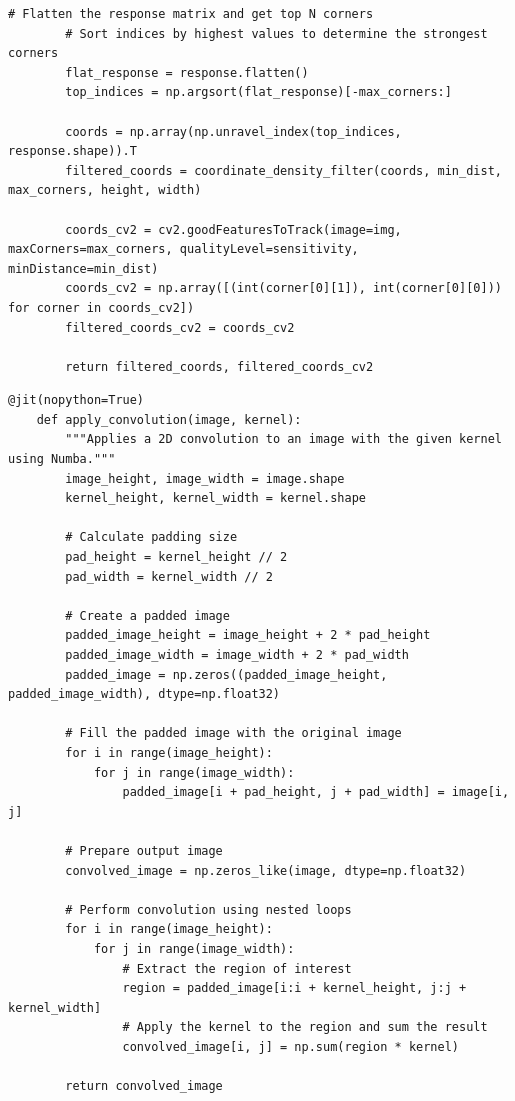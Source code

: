 \documentclass[11pt, conference, letterpaper]{IEEEtran}
\begin{document}
\begin{lstlisting}[style=python, caption={Shi-Tomasi Corners Function}, label={lst:shi-tomasi}]
        # Flatten the response matrix and get top N corners
        # Sort indices by highest values to determine the strongest corners
        flat_response = response.flatten()
        top_indices = np.argsort(flat_response)[-max_corners:]

        coords = np.array(np.unravel_index(top_indices, response.shape)).T
        filtered_coords = coordinate_density_filter(coords, min_dist, max_corners, height, width)

        coords_cv2 = cv2.goodFeaturesToTrack(image=img, maxCorners=max_corners, qualityLevel=sensitivity, minDistance=min_dist)
        coords_cv2 = np.array([(int(corner[0][1]), int(corner[0][0])) for corner in coords_cv2])
        filtered_coords_cv2 = coords_cv2
        
        return filtered_coords, filtered_coords_cv2
\end{lstlisting}

\begin{lstlisting}[style=python, caption={2-Dimensional Convolution Routine}, label={lst:convolution}]
    @jit(nopython=True)
    def apply_convolution(image, kernel):
        """Applies a 2D convolution to an image with the given kernel using Numba."""
        image_height, image_width = image.shape
        kernel_height, kernel_width = kernel.shape
        
        # Calculate padding size
        pad_height = kernel_height // 2
        pad_width = kernel_width // 2
        
        # Create a padded image
        padded_image_height = image_height + 2 * pad_height
        padded_image_width = image_width + 2 * pad_width
        padded_image = np.zeros((padded_image_height, padded_image_width), dtype=np.float32)

        # Fill the padded image with the original image
        for i in range(image_height):
            for j in range(image_width):
                padded_image[i + pad_height, j + pad_width] = image[i, j]

        # Prepare output image
        convolved_image = np.zeros_like(image, dtype=np.float32)

        # Perform convolution using nested loops
        for i in range(image_height):
            for j in range(image_width):
                # Extract the region of interest
                region = padded_image[i:i + kernel_height, j:j + kernel_width]
                # Apply the kernel to the region and sum the result
                convolved_image[i, j] = np.sum(region * kernel)
        
        return convolved_image
\end{lstlisting}
\end{document}
